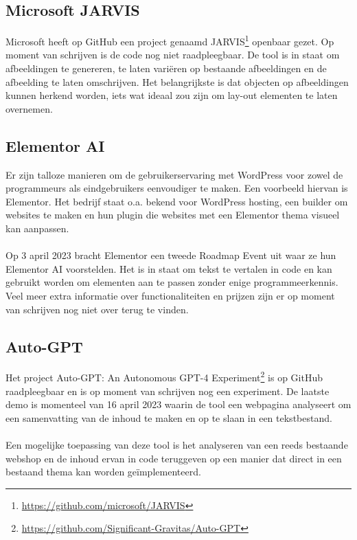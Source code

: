 \subsection{Microsoft JARVIS}
Microsoft heeft op GitHub een project genaamd JARVIS\footnote{\href{https://github.com/microsoft/JARVIS}{https://github.com/microsoft/JARVIS}} openbaar gezet. Op moment van schrijven is de code nog niet raadpleegbaar. De tool is in staat om afbeeldingen te genereren, te laten variëren op bestaande afbeeldingen en de afbeelding te laten omschrijven. Het belangrijkste is dat objecten op afbeeldingen kunnen herkend worden, iets wat ideaal zou zijn om lay-out elementen te laten overnemen.
\label{elementor_ai_hoofdstuk}\subsection{Elementor AI}
Er zijn talloze manieren om de gebruikerservaring met WordPress voor zowel de programmeurs als eindgebruikers eenvoudiger te maken. Een voorbeeld hiervan is Elementor. Het bedrijf staat o.a. bekend voor WordPress hosting, een builder om websites te maken en hun plugin die websites met een Elementor thema visueel kan aanpassen.
\\\\
Op 3 april 2023 bracht Elementor een tweede Roadmap Event \autocite{Laster2023} uit waar ze hun Elementor AI voorstelden. Het is in staat om tekst te vertalen in code en kan gebruikt worden om elementen aan te passen zonder enige programmeerkennis. Veel meer extra informatie over functionaliteiten en prijzen zijn er op moment van schrijven nog niet over terug te vinden.
\subsection{Auto-GPT}
Het project Auto-GPT: An Autonomous GPT-4 Experiment\footnote{\href{https://github.com/Significant-Gravitas/Auto-GPT}{https://github.com/Significant-Gravitas/Auto-GPT}} is op GitHub raadpleegbaar en is op moment van schrijven nog een experiment. De laatste demo is momenteel van 16 april 2023 waarin de tool een webpagina analyseert om een samenvatting van de inhoud te maken en op te slaan in een tekstbestand.
\\\\
Een mogelijke toepassing van deze tool is het analyseren van een reeds bestaande webshop en de inhoud ervan in code teruggeven op een manier dat direct in een bestaand thema kan worden geïmplementeerd.
